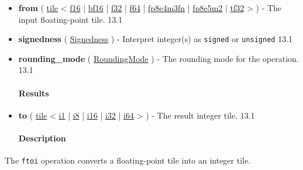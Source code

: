 \documentclass{article}
\begin{document}
\begin{itemize}
\item \textbf{from} ( \href{https://docs.nvidia.com/cuda/tile-ir/latest/sections/types.html#type-tile}{tile} < \href{https://docs.nvidia.com/cuda/tile-ir/latest/sections/types.html#subsection-element-types}{f16} | \href{https://docs.nvidia.com/cuda/tile-ir/latest/sections/types.html#subsection-element-types}{bf16} | \href{https://docs.nvidia.com/cuda/tile-ir/latest/sections/types.html#subsection-element-types}{f32} | \href{https://docs.nvidia.com/cuda/tile-ir/latest/sections/types.html#subsection-element-types}{f64} | \href{https://docs.nvidia.com/cuda/tile-ir/latest/sections/types.html#subsection-element-types}{fp8e4m3fn} | \href{https://docs.nvidia.com/cuda/tile-ir/latest/sections/types.html#subsection-element-types}{fp8e5m2} | \href{https://docs.nvidia.com/cuda/tile-ir/latest/sections/types.html#subsection-element-types}{tf32} > ) - The input floating-point tile. 13.1
\item \textbf{signedness} ( \href{https://docs.nvidia.com/cuda/tile-ir/latest/sections/operations.html#op-attribute-cuda-tile-ftoi-signedness-attr}{Signedness} ) - Interpret integer(s) as \texttt{signed} or \texttt{unsigned} 13.1
\item \textbf{rounding\_mode} ( \href{https://docs.nvidia.com/cuda/tile-ir/latest/sections/operations.html#op-attribute-cuda-tile-ftoi-roundingmode-attr}{RoundingMode} ) - The rounding mode for the operation. 13.1


\paragraph{Results}

\item \textbf{to} ( \href{https://docs.nvidia.com/cuda/tile-ir/latest/sections/types.html#type-tile}{tile} < \href{https://docs.nvidia.com/cuda/tile-ir/latest/sections/types.html#subsection-element-types}{i1} | \href{https://docs.nvidia.com/cuda/tile-ir/latest/sections/types.html#subsection-element-types}{i8} | \href{https://docs.nvidia.com/cuda/tile-ir/latest/sections/types.html#subsection-element-types}{i16} | \href{https://docs.nvidia.com/cuda/tile-ir/latest/sections/types.html#subsection-element-types}{i32} | \href{https://docs.nvidia.com/cuda/tile-ir/latest/sections/types.html#subsection-element-types}{i64} > ) - The result integer tile. 13.1


\paragraph{Description}

\end{itemize}
The \texttt{ftoi} operation converts a floating-point tile into an integer tile.
\end{document}

